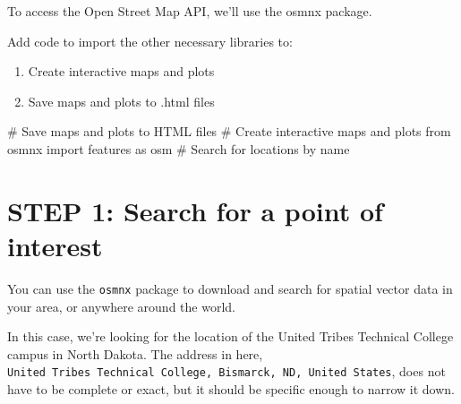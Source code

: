 \documentclass[
  letterpaper,
  DIV=11,
  numbers=noendperiod,
  oneside]{scrreprt}
\newenvironment{Shaded}{\begin{snugshade}}{\end{snugshade}}
\newcommand{\CommentTok}[1]{\textcolor[rgb]{0.37,0.37,0.37}{#1}}
\newcommand{\ImportTok}[1]{\textcolor[rgb]{0.00,0.46,0.62}{#1}}
\newcommand{\NormalTok}[1]{\textcolor[rgb]{0.00,0.23,0.31}{#1}}
\providecommand{\tightlist}{%
  \setlength{\itemsep}{0pt}\setlength{\parskip}{0pt}}
\begin{document}
To access the Open Street Map API, we'll use the osmnx package.

\begin{tcolorbox}[enhanced jigsaw, colbacktitle=quarto-callout-color!10!white, opacityback=0, bottomtitle=1mm, toptitle=1mm, bottomrule=.15mm, left=2mm, colframe=quarto-callout-color-frame, leftrule=.75mm, opacitybacktitle=0.6, colback=white, rightrule=.15mm, toprule=.15mm, breakable, titlerule=0mm, title=\textcolor{quarto-callout-color}{\faInfo}\hspace{0.5em}{Try It}, coltitle=black, arc=.35mm]

Add code to import the other necessary libraries to:

\begin{enumerate}
\def\labelenumi{\arabic{enumi}.}
\tightlist
\item
  Create interactive maps and plots
\item
  Save maps and plots to .html files
\end{enumerate}

\end{tcolorbox}

\begin{Shaded}
\begin{Highlighting}[]
\CommentTok{\# Save maps and plots to HTML files}
\CommentTok{\# Create interactive maps and plots}
\ImportTok{from}\NormalTok{ osmnx }\ImportTok{import}\NormalTok{ features }\ImportTok{as}\NormalTok{ osm }\CommentTok{\# Search for locations by name}
\end{Highlighting}
\end{Shaded}


\chapter{STEP 1: Search for a point of
interest}\label{step-1-search-for-a-point-of-interest}

You can use the \texttt{osmnx} package to download and search for
spatial vector data in your area, or anywhere around the world.

In this case, we're looking for the location of the United Tribes
Technical College campus in North Dakota. The address in here,
\texttt{\textquotesingle{}United\ Tribes\ Technical\ College,\ Bismarck,\ ND,\ United\ States\textquotesingle{}},
does not have to be complete or exact, but it should be specific enough
to narrow it down.
\end{document}
